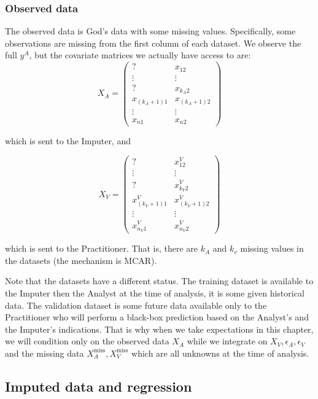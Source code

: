 			\subsubsection{Observed data}
The observed data is God's data with some missing values. Specifically, some observations are missing from the first column of each dataset. We observe the full $y^A$, but the covariate matrices we actually have access to are:
\begin{equation*}
X_A = 
\begin{pmatrix}
? & x_{12} \\
\vdots & \vdots \\
? & x_{k_A2} \\
x_{(k_A+1)1} & x_{(k_A+1)2}\\
\vdots & \vdots \\
x_{n1} & x_{n2}
\end{pmatrix}
\end{equation*}

which is sent to the Imputer, and

\begin{equation*}
X_V = 
\begin{pmatrix}
? & x_{12}^V \\
\vdots & \vdots \\
? & x_{k_V 2}^V \\
x_{(k_V+1)1}^V & x_{(k_V+1)2}^V\\
\vdots & \vdots \\
x_{n_V 1}^V & x_{n_V 2}^V
\end{pmatrix}
\end{equation*}

which is sent to the Practitioner. That is, there are $k_A$ and $k_v$ missing values in the datasets (the mechanism is MCAR).

Note that the datasets have a different status. The training dataset is available to the Imputer then the Analyst at the time of analysis, it is some given historical data. The validation dataset is some future data available only to the Practitioner who will perform a black-box prediction based on the Analyst's and the Imputer's indications. That is why when we take expectations in this chapter, we will condition only on the observed data $X_A$ while we integrate on $X_V, \epsilon_A, \epsilon_V$ and the missing data $X_A^{\text{miss}}, X_V^{\text{miss}}$ which are all unknowns at the time of analysis. 

		\subsection{Imputed data and regression}
